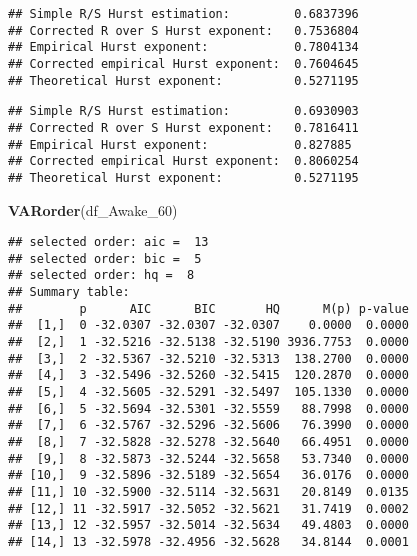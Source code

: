 \documentclass[
]{article}
\newenvironment{Shaded}{\begin{snugshade}}{\end{snugshade}}
\newcommand{\FunctionTok}[1]{\textcolor[rgb]{0.13,0.29,0.53}{\textbf{#1}}}
\newcommand{\NormalTok}[1]{#1}
\newcommand{\SpecialCharTok}[1]{\textcolor[rgb]{0.81,0.36,0.00}{\textbf{#1}}}
\begin{document}
\begin{Shaded}
\end{Shaded}

\begin{verbatim}
## Simple R/S Hurst estimation:         0.6837396 
## Corrected R over S Hurst exponent:   0.7536804 
## Empirical Hurst exponent:            0.7804134 
## Corrected empirical Hurst exponent:  0.7604645 
## Theoretical Hurst exponent:          0.5271195
\end{verbatim}

\begin{Shaded}
\end{Shaded}

\begin{verbatim}
## Simple R/S Hurst estimation:         0.6930903 
## Corrected R over S Hurst exponent:   0.7816411 
## Empirical Hurst exponent:            0.827885 
## Corrected empirical Hurst exponent:  0.8060254 
## Theoretical Hurst exponent:          0.5271195
\end{verbatim}

\begin{Shaded}
\begin{Highlighting}[]
\FunctionTok{VARorder}\NormalTok{(df\_Awake\_60)}
\end{Highlighting}
\end{Shaded}

\begin{verbatim}
## selected order: aic =  13 
## selected order: bic =  5 
## selected order: hq =  8 
## Summary table:  
##        p      AIC      BIC       HQ      M(p) p-value
##  [1,]  0 -32.0307 -32.0307 -32.0307    0.0000  0.0000
##  [2,]  1 -32.5216 -32.5138 -32.5190 3936.7753  0.0000
##  [3,]  2 -32.5367 -32.5210 -32.5313  138.2700  0.0000
##  [4,]  3 -32.5496 -32.5260 -32.5415  120.2870  0.0000
##  [5,]  4 -32.5605 -32.5291 -32.5497  105.1330  0.0000
##  [6,]  5 -32.5694 -32.5301 -32.5559   88.7998  0.0000
##  [7,]  6 -32.5767 -32.5296 -32.5606   76.3990  0.0000
##  [8,]  7 -32.5828 -32.5278 -32.5640   66.4951  0.0000
##  [9,]  8 -32.5873 -32.5244 -32.5658   53.7340  0.0000
## [10,]  9 -32.5896 -32.5189 -32.5654   36.0176  0.0000
## [11,] 10 -32.5900 -32.5114 -32.5631   20.8149  0.0135
## [12,] 11 -32.5917 -32.5052 -32.5621   31.7419  0.0002
## [13,] 12 -32.5957 -32.5014 -32.5634   49.4803  0.0000
## [14,] 13 -32.5978 -32.4956 -32.5628   34.8144  0.0001
\end{verbatim}
\end{document}
